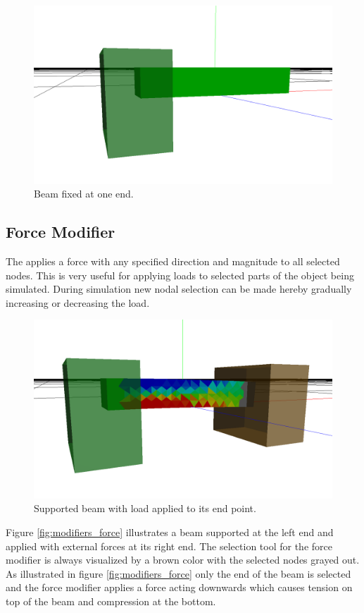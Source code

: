 \begin{figure}
  \centering
  \includegraphics[width=12cm]{./images/helper_tools_modifiers_fixed.png}
\caption{Beam fixed at one end.}
\label{fig:modifiers_fixed}
\end{figure}


\subsection{Force Modifier}
The  applies a force with any specified direction and magnitude to
all selected nodes. This is very useful for applying loads to
selected parts of the object being simulated. During simulation new nodal
selection can be made hereby gradually increasing or decreasing the load.

\begin{figure}
  \centering
  \includegraphics[width=12cm]{./images/helper_tools_modifiers_force.png}
\caption{Supported beam with load applied to its end point.}
\label{fig:modifiers_force}
\end{figure}

Figure \vref{fig:modifiers_force} illustrates a beam supported at the
left end and applied with external forces at its right end. The selection tool for the
force modifier is always visualized by a brown color with the
selected nodes grayed out. As illustrated in figure
\vref{fig:modifiers_force} only the end of the beam is selected and the
force modifier applies a force acting downwards which causes tension
on top of the beam and compression at the bottom. 


